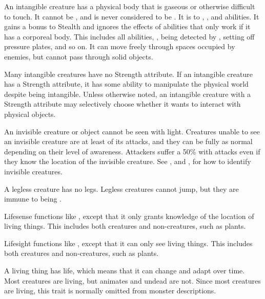   An intangible creature has a physical body that is gaseous or otherwise difficult to touch.
  It cannot be , and is never considered to be \squeezing.
  It is  to , \atCreation, and \atManifestation abilities.
  It gains a  bonus to Stealth and ignores the effects of abilities that only work if it has a corporeal body.
  This includes all  abilities, , being detected by , setting off pressure plates, and so on.
  It can move freely through spaces occupied by enemies, but cannot pass through solid objects.

  Many intangible creatures have no Strength attribute.
  If an intangible creature has a Strength attribute, it has some ability to manipulate the physical world despite being intangible.
  Unless otherwise noted, an intangible creature with a Strength attribute may selectively choose whether it wants to interact with physical objects.

  An invisible creature or object cannot be seen with light.
  Creatures unable to see an invisible creature are at least \partiallyunaware of its attacks, and they can be fully \unaware as normal depending on their level of awareness.
  Attackers suffer a 50\%  with  attacks even if they know the location of the invisible creature.
  See , and , for how to identify invisible creatures.

  A legless creature has no legs.
  Legless creatures cannot jump, but they are immune to being \prone.

  Lifesense functions like , except that it only grants knowledge of the location of living things.
  This includes both creatures and non-creatures, such as plants.

  Lifesight functions like , except that it can only see living things.
  This includes both creatures and non-creatures, such as plants.

  A living thing has life, which means that it can change and adapt over time.
  Most creatures are living, but animates and undead are not.
  Since most creatures are living, this trait is normally omitted from monster descriptions.

